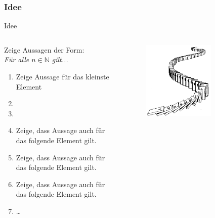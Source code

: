 \subsubsection{Idee}
\begin{frame}[fragile]{Idee}
\begin{columns}
    \begin{alertblock}{Zeige Aussagen der Form:\\\emph{Für alle $n\in\mathbb{N}$ gilt...}}
    \begin{enumerate}
        \item Zeige Aussage für das kleinste Element
        \item<1-> 
        \item<2-6,8> 
        \item<3-6> \footnotesize Zeige, dass Aussage auch für das folgende Element gilt.
        \item<4-6> \scriptsize Zeige, dass Aussage auch für das folgende Element gilt.
        \item<5-6> \tiny Zeige, dass Aussage auch für das folgende Element gilt.
        \item<6> \dots
    \end{enumerate}
    \end{alertblock}
    \begin{figure}
        \centering
        \includegraphics[width=0.7\textwidth]{figures/induction.jpg}
    \end{figure}
\end{columns}
\end{frame}

